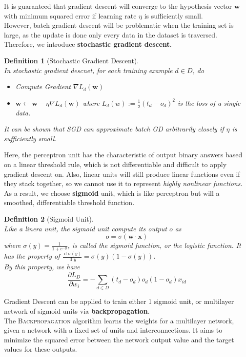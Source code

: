 \documentclass[12pt]{article}
\newtheorem{definition}{Definition}[section]
\theoremstyle{definition}
\DeclareMathOperator{\diff}{d}
\begin{document}
It is guaranteed that gradient descent will converge to the hypothesis vector $\mathbf{w}$ with minimum squared error if learning rate $\eta$ is sufficiently small.\\
However, batch gradient descent will be problematic when the training set is large, as the update is done only every data in the dataset is traversed. Therefore, we introduce \textbf{stochastic gradient descent}.
\begin{definition}[Stochastic Gradient Descent]
\hfill\\\normalfont In stochastic gradient descnet, for each training example $d\in D$, do
\begin{itemize}
	\item Compute Gradient $\nabla L_d(\mathbf{w})$
	\item $\mathbf{w}\leftarrow \mathbf{w}-\eta\nabla L_d(\mathbf{w})$ where $L_d(w):=\frac{1}{2}(t_d-o_d)^2$ is the loss of a single data.
\end{itemize}
It can be shown that SGD can approximate batch GD arbitrarily closely if $\eta$ is sufficiently small.
\end{definition}
Here, the perceptron unit has the characteristic of output binary answers based on a linear threshold rule, which is not differentiable and difficult to apply gradient descent on. Also, linear units will still produce linear functions even if they stack together, so we cannot use it to represent \textit{highly nonlinear functions}. As a result, we choose \textbf{sigmoid} unit, which is like perceptron but will a smoothed, differentiable threshold function.
\begin{definition}[Sigmoid Unit]
\hfill\\\normalfont Like a linera unit, the sigmoid unit compute its output $o$ as 
\[
o=\sigma(\mathbf{w}\cdot\mathbf{x})
\]
where $\sigma(y)=\frac{1}{1+e^{-y}}$, is called the sigmoid function, or the logistic function. It has the property of $\frac{\diff \sigma(y)}{\diff y}=\sigma(y)(1-\sigma(y))$.\\
By this property, we have 
\[
\frac{\partial L_D}{\partial w_i}=-\sum_{d\in D}(t_d-o_d)o_d(1-o_d)x_{id}
\]
\end{definition}
Gradient Descent can be applied to train either 1 sigmoid unit, or multilayer network of sigmoid units via \textbf{backpropagation}.\\
The \textsc{Backpropagation} algorithm learns the weights for a multilayer network, given a network with a fixed set of units and interconnections. It aims to minimize the squared error between the network output value and the target values for these outputs.\\
\end{document}
